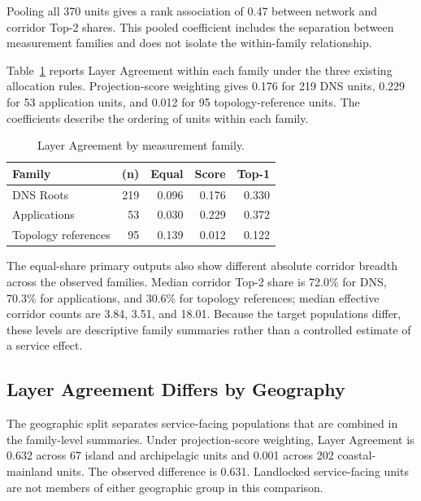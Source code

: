 Pooling all 370 units gives a rank association of 0.47 between network and
corridor Top-2 shares. This pooled coefficient includes the separation between
measurement families and does not isolate the within-family relationship.

Table~\ref{tab:family-agreement} reports Layer Agreement within each family
under the three existing allocation rules. Projection-score weighting gives
0.176 for 219 DNS units, 0.229 for 53 application units, and 0.012 for 95
topology-reference units. The coefficients describe the ordering of units
within each family.

\begin{table}[t]
  \centering
  \caption{Layer Agreement by measurement family.}
  \label{tab:family-agreement}
  \footnotesize
  \setlength{\tabcolsep}{4.0pt}
  \begin{tabular}{lrrrr}
    \toprule
    Family & (n) & Equal & Score & Top-1 \\
    \midrule
    DNS Roots & 219 & 0.096 & 0.176 & 0.330 \\
    Applications & 53 & 0.030 & 0.229 & 0.372 \\
    Topology references & 95 & 0.139 & 0.012 & 0.122 \\
    \bottomrule
  \end{tabular}
\end{table}

The equal-share primary outputs also show different absolute corridor breadth
across the observed families. Median corridor Top-2 share is 72.0\% for DNS,
70.3\% for applications, and 30.6\% for topology references; median effective
corridor counts are 3.84, 3.51, and 18.01. Because the target populations
differ, these levels are descriptive family summaries rather than a controlled
estimate of a service effect.

\subsection{Layer Agreement Differs by Geography}
\label{subsec:geographic-agreement}

The geographic split separates service-facing populations that are combined in
the family-level summaries. Under projection-score weighting, Layer Agreement
is 0.632 across 67 island and archipelagic units and 0.001 across 202 coastal-
mainland units. The observed difference is 0.631. Landlocked service-facing
units are not members of either geographic group in this comparison.

